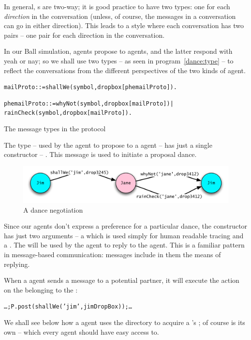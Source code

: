 In general, s are two-way; it is good practice to have two types: one for each \emph{direction} in the conversation (unless, of course, the messages in a conversation can go in either direction). This leads to a style where each conversation has two  pairs -- one pair for each direction in the conversation.

In our Ball simulation, \mail agents propose to \phemail agents, and the latter respond with yeah or nay; so we shall use two types -- as seen in program~\vref{dance:type} -- to reflect the conversations from the different perspectives of the two kinds of agent.
\begin{program}
\vspace{0.5ex}
\begin{alltt}
mailProto::=shallWe(symbol,dropbox[phemailProto]).

phemailProto::=whyNot(symbol,dropbox[mailProto]) | 
                 rainCheck(symbol,dropbox[mailProto]).
\end{alltt}
\vspace{-2ex}
\caption{The message types in the  protocol}
\label{dance:type}
\end{program}
The  type -- used by the \mail agent to propose to a \phemail agent -- has just a single constructor -- . This message is used to initiate a proposal dance.

\begin{figure}
\centering\includegraphics[width=\textwidth]{protocol}
\caption{\label{dance:protocol}A dance negotiation}
\end{figure}

Since our \mail agents don't express a preference for a particular dance, the  constructor has just two arguments -- a  which is used simply for human readable tracing and a . The  will be used by the \phemail agent to reply to the \mail agent. This is a familiar pattern in message-based communication: messages include in them the means of replying.

When a \mail agent sends a  message to a potential partner, it will execute the  action on the  belonging to the \phemail:
\begin{alltt}
\ldots;P.post(shallWe('jim',jimDropBox));\ldots
\end{alltt}
We shall see below how a \mail agent uses the directory to acquire a \phemail's ; of course  is its own  -- which every agent should have easy access to.

